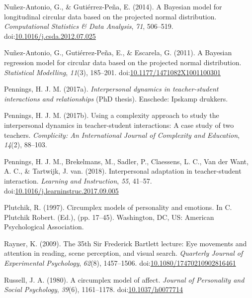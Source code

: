 \documentclass[man]{apa6}
\DeclareRobustCommand{\VANDER}[3]{#2}
\theoremstyle{definition}
\theoremstyle{definition}
\theoremstyle{definition}
\theoremstyle{remark}
\begin{document}
\leavevmode\hypertarget{ref-nunez2014bayesian}{}%
Nuñez-Antonio, G., \& Gutiérrez-Peña, E. (2014). A Bayesian model for
longitudinal circular data based on the projected normal distribution.
\emph{Computational Statistics \& Data Analysis}, \emph{71}, 506--519.
doi:\href{https://doi.org/10.1016/j.csda.2012.07.025}{10.1016/j.csda.2012.07.025}

\leavevmode\hypertarget{ref-nunez2011bayesian}{}%
Nuñez-Antonio, G., Gutiérrez-Peña, E., \& Escarela, G. (2011). A
Bayesian regression model for circular data based on the projected
normal distribution. \emph{Statistical Modelling}, \emph{11}(3),
185--201.
doi:\href{https://doi.org/10.1177/1471082X1001100301}{10.1177/1471082X1001100301}

\leavevmode\hypertarget{ref-pennings2017phd}{}%
Pennings, H. J. M. (2017a). \emph{Interpersonal dynamics in
teacher-student interactions and relationships} (PhD thesis). Enschede:
Ipskamp drukkers.

\leavevmode\hypertarget{ref-pennings2017complexity}{}%
Pennings, H. J. M. (2017b). Using a complexity approach to study the
interpersonal dynamics in teacher-student interactions: A case study of
two teachers. \emph{Complicity: An International Journal of Complexity
and Education}, \emph{14}(2), 88--103.

\leavevmode\hypertarget{ref-pennings2018interpersonal}{}%
Pennings, H. J. M., Brekelmans, M., Sadler, P., Claessens, L. C.,
\VANDER{Want}{Van der}{van der} Want, A. C., \& Tartwijk, J. van.
(2018). Interpersonal adaptation in teacher-student interaction.
\emph{Learning and Instruction}, \emph{55}, 41--57.
doi:\href{https://doi.org/10.1016/j.learninstruc.2017.09.005}{10.1016/j.learninstruc.2017.09.005}

\leavevmode\hypertarget{ref-plutchik1997general}{}%
Plutchik, R. (1997). Circumplex models of personality and emotions. In
C. Plutchik Robert. (Ed.), (pp. 17--45). Washington, DC, US: American
Psychological Association.

\leavevmode\hypertarget{ref-rayner200935th}{}%
Rayner, K. (2009). The 35th Sir Frederick Bartlett lecture: Eye
movements and attention in reading, scene perception, and visual search.
\emph{Quarterly Journal of Experimental Psychology}, \emph{62}(8),
1457--1506.
doi:\href{https://doi.org/10.1080/17470210902816461}{10.1080/17470210902816461}

\leavevmode\hypertarget{ref-russell1980circumplex}{}%
Russell, J. A. (1980). A circumplex model of affect. \emph{Journal of
Personality and Social Psychology}, \emph{39}(6), 1161--1178.
doi:\href{https://doi.org/10.1037/h0077714}{10.1037/h0077714}
\end{document}
